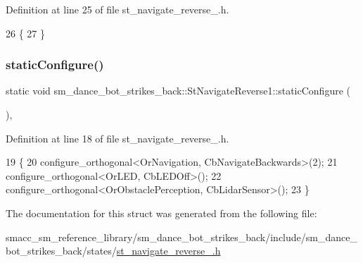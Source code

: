 Definition at line 25 of file st\+\_\+navigate\+\_\+reverse\+\_.\+h.


\begin{DoxyCode}
26    \{
27    \}
\end{DoxyCode}
\mbox{\label{structsm__dance__bot__strikes__back_1_1StNavigateReverse1_ab18ebf4908ab63512a6620b75690cace}} 
\subsubsection{\texorpdfstring{static\+Configure()}{staticConfigure()}}
{\footnotesize\ttfamily static void sm\+\_\+dance\+\_\+bot\+\_\+strikes\+\_\+back\+::\+St\+Navigate\+Reverse1\+::static\+Configure (\begin{DoxyParamCaption}{ }\end{DoxyParamCaption})\hspace{0.3cm}{\ttfamily [inline]}, {\ttfamily [static]}}



Definition at line 18 of file st\+\_\+navigate\+\_\+reverse\+\_.\+h.


\begin{DoxyCode}
19    \{
20       configure\_orthogonal<OrNavigation, CbNavigateBackwards>(2);
21       configure\_orthogonal<OrLED, CbLEDOff>();
22       configure\_orthogonal<OrObstaclePerception, CbLidarSensor>();
23    \}
\end{DoxyCode}


The documentation for this struct was generated from the following file\+:\begin{DoxyCompactItemize}
\item 
smacc\+\_\+sm\+\_\+reference\+\_\+library/sm\+\_\+dance\+\_\+bot\+\_\+strikes\+\_\+back/include/sm\+\_\+dance\+\_\+bot\+\_\+strikes\+\_\+back/states/\hyperlink{strikes__back_2include_2sm__dance__bot__strikes__back_2states_2st__navigate__reverse__1_8h}{st\+\_\+navigate\+\_\+reverse\+\_.\+h}\end{DoxyCompactItemize}
